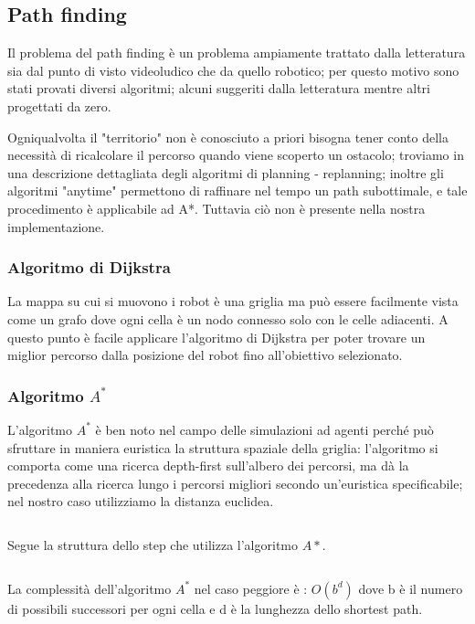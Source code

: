 \subsection{Path finding}
  Il problema del path finding è un problema ampiamente trattato dalla letteratura sia
  dal punto di visto videoludico che da quello robotico; per questo motivo sono stati
  provati diversi algoritmi; alcuni suggeriti dalla letteratura mentre altri progettati da zero.
  
  Ogniqualvolta il "territorio" non è conosciuto a priori bisogna tener conto della
  necessità di ricalcolare il percorso quando viene scoperto un ostacolo; troviamo in
  \cite{ferguson2005guide} una descrizione dettagliata degli algoritmi di planning - replanning;
  inoltre gli algoritmi "anytime" permettono di raffinare nel tempo un path subottimale, e
  tale procedimento è applicabile ad A*. Tuttavia ciò non è presente nella nostra
  implementazione.
  \subsubsection{Algoritmo di Dijkstra}
    La mappa su cui si muovono i robot è una griglia ma può essere facilmente vista
    come un grafo dove ogni cella è un nodo connesso solo con le celle adiacenti. A questo
    punto è facile applicare l'algoritmo di Dijkstra per poter
    trovare un miglior percorso dalla posizione del robot fino all'obiettivo selezionato.
  \subsubsection{Algoritmo $A^*$}
  \label{complastar}
  L'algoritmo $A^*$ \cite{wiki:A*} è ben noto nel campo delle simulazioni ad agenti
  perché può sfruttare in maniera euristica la struttura spaziale della
  griglia: l'algoritmo si comporta come una ricerca depth-first sull'albero
  dei percorsi, ma dà la precedenza alla ricerca lungo i percorsi migliori
  secondo un'euristica specificabile; nel nostro caso utilizziamo la
  distanza euclidea.
  \inputminted[linenos,fontsize=\footnotesize]{python}{algoritmi/astar.py}
  Segue la struttura dello step che utilizza l'algoritmo $A*$.
  \inputminted[linenos,fontsize=\footnotesize]{python}{algoritmi/step_astar.py}
  La complessità dell'algoritmo $A^*$ nel caso peggiore è : $O(b^d)$ dove b è il numero di
  possibili successori per ogni cella e d è la lunghezza dello shortest path. 
  \newpage
